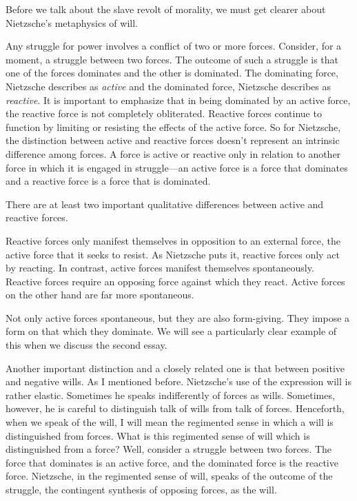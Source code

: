 Before we talk about the slave revolt of morality, we must get clearer about Nietzsche's metaphysics of will.

Any struggle for power involves a conflict of two or more forces. Consider, for a moment, a struggle between two forces. The outcome of such a struggle is that one of the forces dominates and the other is dominated. The dominating force, Nietzsche describes as \emph{active} and the dominated force, Nietzsche describes as \emph{reactive}. It is important to emphasize that in being dominated by an active force, the reactive force is not completely obliterated. Reactive forces continue to function by limiting or resisting the effects of the active force. So for Nietzsche, the distinction between active and reactive forces doesn't represent an intrinsic difference among forces. A force is active or reactive only in relation to another force in which it is engaged in struggle---an active force is a force that dominates and a reactive force is a force that is dominated.

There are at least two important qualitative differences between active and reactive forces. 

Reactive forces only manifest themselves in opposition to an external force, the active force that it seeks to resist. As Nietzsche puts it, reactive forces only act by reacting. In contrast, active forces manifest themselves spontaneously. Reactive forces require an opposing force against which they react. Active forces on the other hand are far more spontaneous.

Not only active forces spontaneous, but they are also form-giving. They impose a form on that which they dominate. We will see a particularly clear example of this when we discuss the second essay.

Another important distinction and a closely related one is that between positive and negative wills. As I mentioned before. Nietzsche's use of the expression will is rather elastic. Sometimes he speaks indifferently of forces as wills. Sometimes, however, he is careful to distinguish talk of wills from talk of forces. Henceforth, when we speak of the will, I will mean the regimented sense in which a will is distinguished from forces. What is this regimented sense of will which is distinguished from a force? Well, consider a struggle between two forces. The force that dominates is an active force, and the dominated force is the reactive force. Nietzsche, in the regimented sense of will, speaks of the outcome of the struggle, the contingent synthesis of opposing forces, as the will.

